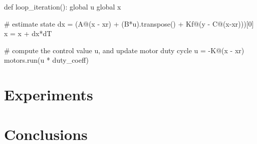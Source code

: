 \documentclass[]{article}
\begin{document}
 
\begin{python}
def loop_iteration():
	global u
	global x

	# estimate state
	dx = (A@(x - xr) + (B*u).transpose() + Kf@(y - C@(x-xr)))[0]  
	x = x + dx*dT

	# compute the control value u, and update motor duty cycle
	u = -K@(x - xr)  
	motors.run(u * duty_coeff)
\end{python}

\section*{Experiments}

\section*{Conclusions}
	




	
\end{document}

